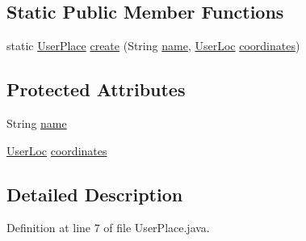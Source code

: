 \subsection*{\-Static \-Public \-Member \-Functions}
\begin{DoxyCompactItemize}
\item 
static \hyperlink{classlab_1_1davidahn_1_1appshuttle_1_1collect_1_1env_1_1_user_place}{\-User\-Place} \hyperlink{classlab_1_1davidahn_1_1appshuttle_1_1collect_1_1env_1_1_user_place_a32034708c41f0b6f1423d59948bdbd0d}{create} (\-String \hyperlink{classlab_1_1davidahn_1_1appshuttle_1_1collect_1_1env_1_1_user_place_a6d2970fca5b2e10d26daa0e550b583b1}{name}, \hyperlink{classlab_1_1davidahn_1_1appshuttle_1_1collect_1_1env_1_1_user_loc}{\-User\-Loc} \hyperlink{classlab_1_1davidahn_1_1appshuttle_1_1collect_1_1env_1_1_user_place_a8f16ba4d6dd464e972a5abc34f2f6a00}{coordinates})
\end{DoxyCompactItemize}
\subsection*{\-Protected \-Attributes}
\begin{DoxyCompactItemize}
\item 
\-String \hyperlink{classlab_1_1davidahn_1_1appshuttle_1_1collect_1_1env_1_1_user_place_a6d2970fca5b2e10d26daa0e550b583b1}{name}
\item 
\hyperlink{classlab_1_1davidahn_1_1appshuttle_1_1collect_1_1env_1_1_user_loc}{\-User\-Loc} \hyperlink{classlab_1_1davidahn_1_1appshuttle_1_1collect_1_1env_1_1_user_place_a8f16ba4d6dd464e972a5abc34f2f6a00}{coordinates}
\end{DoxyCompactItemize}


\subsection{\-Detailed \-Description}


\-Definition at line 7 of file \-User\-Place.\-java.




